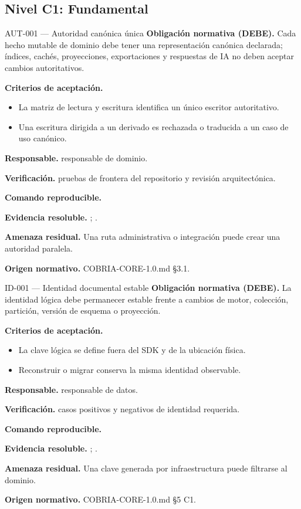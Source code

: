 \newcommand{\ConteoRequisitos}{18}
\subsection{Nivel C1: Fundamental}
\label{nivel:c1}
\begin{requisito}{AUT-001 --- Autoridad canónica única}
\textbf{Obligación normativa (DEBE).} Cada hecho mutable de dominio debe tener una representación canónica declarada; índices, cachés, proyecciones, exportaciones y respuestas de IA no deben aceptar cambios autoritativos.\par
\textbf{Criterios de aceptación.}
\begin{itemize}
\item La matriz de lectura y escritura identifica un único escritor autoritativo.
\item Una escritura dirigida a un derivado es rechazada o traducida a un caso de uso canónico.
\end{itemize}
\textbf{Responsable.} responsable de dominio.\par
\textbf{Verificación.} pruebas de frontera del repositorio y revisión arquitectónica.\par
\textbf{Comando reproducible.} \texttt{}\par
\textbf{Evidencia resoluble.} ; .\par
\textbf{Amenaza residual.} Una ruta administrativa o integración puede crear una autoridad paralela.\par
\textbf{Origen normativo.} COBRIA-CORE-1.0.md §3.1.
\end{requisito}
\begin{requisito}{ID-001 --- Identidad documental estable}
\textbf{Obligación normativa (DEBE).} La identidad lógica debe permanecer estable frente a cambios de motor, colección, partición, versión de esquema o proyección.\par
\textbf{Criterios de aceptación.}
\begin{itemize}
\item La clave lógica se define fuera del SDK y de la ubicación física.
\item Reconstruir o migrar conserva la misma identidad observable.
\end{itemize}
\textbf{Responsable.} responsable de datos.\par
\textbf{Verificación.} casos positivos y negativos de identidad requerida.\par
\textbf{Comando reproducible.} \texttt{}\par
\textbf{Evidencia resoluble.} ; .\par
\textbf{Amenaza residual.} Una clave generada por infraestructura puede filtrarse al dominio.\par
\textbf{Origen normativo.} COBRIA-CORE-1.0.md §5 C1.
\end{requisito}
